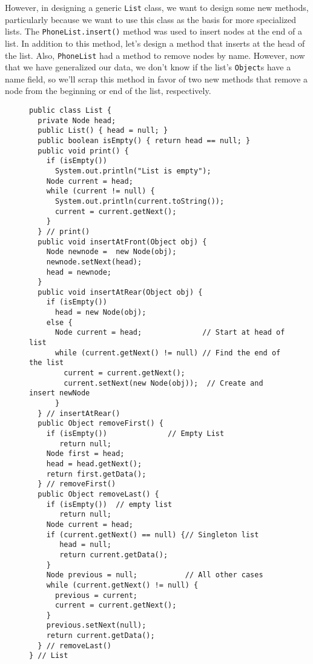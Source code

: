 However, in designing a generic {\tt List} class, we want to design
some new methods, particularly because we want to use this class as the
basis for more specialized lists.  The {\tt PhoneList.insert()} method
was used to insert nodes at the end of a list.  In addition to this
method, let's design a method that inserts at the head of the
list.  Also, {\tt PhoneList} had a method to remove nodes by
name.  However, now that we have generalized our data, we don't know if
the list's {\tt Object}s have a name field, so we'll scrap this method
in favor of two new methods that remove a node from the beginning or
end of the list, respectively.

\begin{figure}[p!]
\jjjprogstart
\begin{jjjlisting}[32pc]
\begin{lstlisting}
public class List {
  private Node head;
  public List() { head = null; }
  public boolean isEmpty() { return head == null; }
  public void print() {
    if (isEmpty())
      System.out.println("List is empty");
    Node current = head;
    while (current != null) {
      System.out.println(current.toString());
      current = current.getNext();
    }
  } // print()
  public void insertAtFront(Object obj) {
    Node newnode =  new Node(obj);
    newnode.setNext(head);
    head = newnode;
  }
  public void insertAtRear(Object obj) {
    if (isEmpty())
      head = new Node(obj);
    else {
      Node current = head;              // Start at head of list
      while (current.getNext() != null) // Find the end of the list
        current = current.getNext();
        current.setNext(new Node(obj));  // Create and insert newNode
      }
  } // insertAtRear()
  public Object removeFirst() {
    if (isEmpty())              // Empty List
       return null;
    Node first = head;
    head = head.getNext();
    return first.getData();
  } // removeFirst()
  public Object removeLast() {
    if (isEmpty())  // empty list
       return null;
    Node current = head;
    if (current.getNext() == null) {// Singleton list
       head = null;
       return current.getData();
    }
    Node previous = null;           // All other cases
    while (current.getNext() != null) {
      previous = current;
      current = current.getNext();
    }
    previous.setNext(null);
    return current.getData();
  } // removeLast()
} // List
\end{lstlisting}
\end{jjjlisting}
\end{figure}

